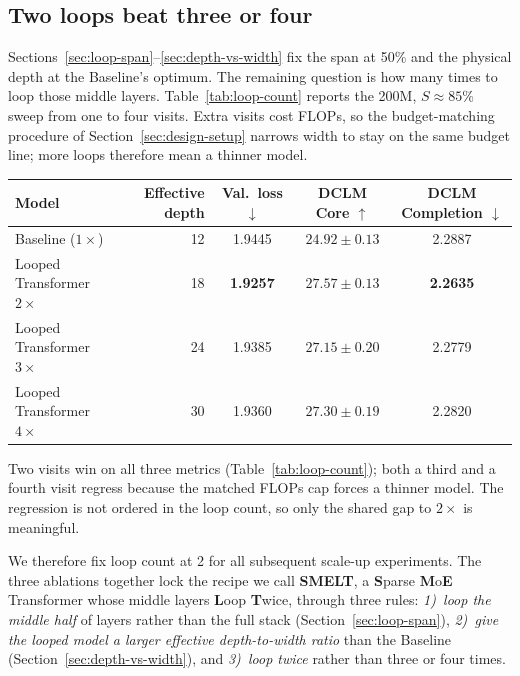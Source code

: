 \documentclass[]{bytedance_seed}
\newcommand{\archname}{SMELT}
\theoremstyle{definition}
\theoremstyle{remark}
\begin{document}
\subsection{Two loops beat three or four}
\label{sec:loop-count}

Sections~\ref{sec:loop-span}--\ref{sec:depth-vs-width} fix the span at 50\% and the physical depth at the Baseline's optimum.
%
The remaining question is how many times to loop those middle layers.
%
Table~\ref{tab:loop-count} reports the 200M, $S \approx 85\%$ sweep from one to four visits.
%
Extra visits cost FLOPs, so the budget-matching procedure of Section~\ref{sec:design-setup} narrows width to stay on the same budget line; more loops therefore mean a thinner model.
%

\begin{center}
\small
{}
\label{tab:loop-count}
\begin{tabular}{lrccc}
\toprule
Model & Effective depth & Val.\ loss $\downarrow$ & DCLM Core $\uparrow$ & DCLM Completion $\downarrow$ \\
\midrule
Baseline ($1\times$) & 12 & 1.9445 & $24.92 \pm 0.13$ & 2.2887 \\
Looped Transformer $2\times$ & 18 & \textbf{1.9257} & $\mathbf{27.57 \pm 0.13}$ & \textbf{2.2635} \\
Looped Transformer $3\times$ & 24 & 1.9385 & $27.15 \pm 0.20$ & 2.2779 \\
Looped Transformer $4\times$ & 30 & 1.9360 & $27.30 \pm 0.19$ & 2.2820 \\
\bottomrule
\end{tabular}
\end{center}

Two visits win on all three metrics (Table~\ref{tab:loop-count}); both a third and a fourth visit regress because the matched FLOPs cap forces a thinner model.
%
The regression is not ordered in the loop count, so only the shared gap to $2\times$ is meaningful.
%

We therefore fix loop count at 2 for all subsequent scale-up experiments.
%
The three ablations together lock the recipe we call \textbf{\archname{}}, a \textbf{S}parse \textbf{M}o\textbf{E} Transformer whose middle layers \textbf{L}oop \textbf{T}wice, through three rules: \textit{1)~loop the middle half} of layers rather than the full stack (Section~\ref{sec:loop-span}), \textit{2)~give the looped model a larger effective depth-to-width ratio} than the Baseline (Section~\ref{sec:depth-vs-width}), and \textit{3)~loop twice} rather than three or four times.
\end{document}
